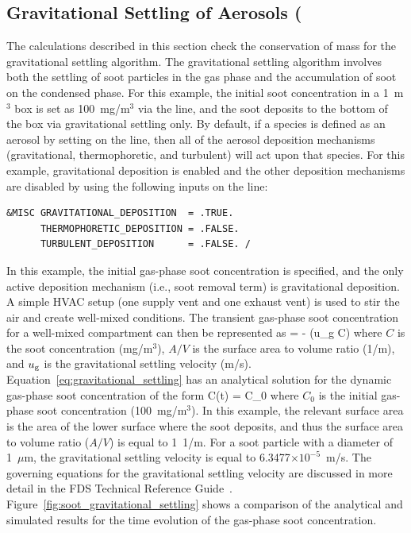 \documentclass[11pt]{book}
\begin{document}
\clearpage

\subsection{Gravitational Settling of Aerosols (\texorpdfstring{})}

The calculations described in this section check the conservation of mass for the gravitational settling algorithm. The gravitational settling algorithm involves both the settling of soot particles in the gas phase and the accumulation of soot on the condensed phase. For this example, the initial soot concentration in a 1~m$^3$ box is set as 100~mg/m$^3$ via the  line, and the soot deposits to the bottom of the box via gravitational settling only. By default, if a species is defined as an aerosol by setting  on the  line, then all of the aerosol deposition mechanisms (gravitational, thermophoretic, and turbulent) will act upon that species. For this example, gravitational deposition is enabled and the other deposition mechanisms are disabled by using the following inputs on the  line:

\begin{lstlisting}
&MISC GRAVITATIONAL_DEPOSITION  = .TRUE.
      THERMOPHORETIC_DEPOSITION = .FALSE.
      TURBULENT_DEPOSITION      = .FALSE. /
\end{lstlisting}

\noindent In this example, the initial gas-phase soot concentration is specified, and the only active deposition mechanism (i.e., soot removal term) is gravitational deposition. A simple HVAC setup (one supply vent and one exhaust vent) is used to stir the air and create well-mixed conditions. The transient gas-phase soot concentration for a well-mixed compartment can then be represented as
\be
{} = - (u_{\rm g} C)
\label{eq:gravitational_settling}
\ee
where $C$ is the soot concentration (mg/m$^3$), $A/V$ is the surface area to volume ratio (\si{1/m}), and $u_{\rm g}$ is the gravitational settling velocity (m/s). Equation~\ref{eq:gravitational_settling} has an analytical solution for the dynamic gas-phase soot concentration of the form
\be
C(t) = C_0 \exp {}
\ee
where $C_0$ is the initial gas-phase soot concentration (100~mg/m$^3$). In this example, the relevant surface area is the area of the lower surface where the soot deposits, and thus the surface area to volume ratio ($A/V$) is equal to \SI{1}{1/m}. For a soot particle with a diameter of 1~$\mu$m, the gravitational settling velocity is equal to 6.3477$\times 10^{-5}$~m/s. The governing equations for the gravitational settling velocity are discussed in more detail in the FDS Technical Reference Guide~\cite{FDS_Math_Guide}. Figure~\ref{fig:soot_gravitational_settling} shows a comparison of the analytical and simulated results for the time evolution of the gas-phase soot concentration.
\end{document}
